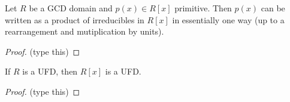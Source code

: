 \documentclass{article}
\begin{document}

\begin{prop}
Let $R$ be a GCD domain and $p(x) \in R[x]$ primitive. Then $p(x)$ can be written as a product of irreducibles in $R[x]$ in essentially one way (up to a rearrangement and mutiplication by units).
\end{prop}

\begin{proof}
(type this)
\end{proof}

\begin{cor}
If $R$ is a UFD, then $R[x]$ is a UFD.
\end{cor}

\begin{proof}
(type this)
\end{proof}
\end{document}

